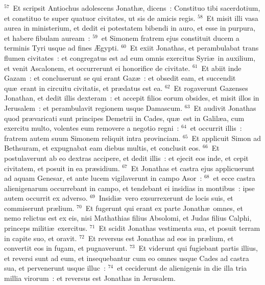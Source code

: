 ${}^{57}$~Et scripsit Antiochus adolescens Jonath\ae , dicens~: Constituo tibi sacerdotium, et constituo te super quatuor civitates, ut sis de amicis regis.
${}^{58}$~Et misit illi vasa aurea in ministerium, et dedit ei potestatem bibendi in auro, et esse in purpura, et habere fibulam auream~:
${}^{59}$~et Simonem fratrem ejus constituit ducem a terminis Tyri usque ad fines \AE gypti.
${}^{60}$~Et exiit Jonathas, et perambulabat trans flumen civitates~: et congregatus est ad eum omnis exercitus Syri\ae\ in auxilium, et venit Ascalonem, et occurrerunt ei honorifice de civitate.
${}^{61}$~Et abiit inde Gazam~: et concluserunt se qui erant Gaz\ae~: et obsedit eam, et succendit qu\ae\ erant in circuitu civitatis, et pr\ae datus est ea.
${}^{62}$~Et rogaverunt Gazenses Jonathan, et dedit illis dexteram~: et accepit filios eorum obsides, et misit illos in Jerusalem~: et perambulavit regionem usque Damascum.
${}^{63}$~Et audivit Jonathas quod pr\ae varicati sunt principes Demetrii in Cades, qu\ae\ est in Galil\ae a, cum exercitu multo, volentes eum removere a negotio regni~:
${}^{64}$~et occurrit illis~: fratrem autem suum Simonem reliquit intra provinciam.
${}^{65}$~Et applicuit Simon ad Bethsuram, et expugnabat eam diebus multis, et conclusit eos.
${}^{66}$~Et postulaverunt ab eo dextras accipere, et dedit illis~: et ejecit eos inde, et cepit civitatem, et posuit in ea pr\ae sidium.
${}^{67}$~Et Jonathas et castra ejus applicuerunt ad aquam Genesar, et ante lucem vigilaverunt in campo Asor~:
${}^{68}$~et ecce castra alienigenarum occurrebant in campo, et tendebant ei insidias in montibus~: ipse autem occurrit ex adverso.
${}^{69}$~Insidi\ae\ vero exsurrexerunt de locis suis, et commiserunt pr\ae lium.
${}^{70}$~Et fugerunt qui erant ex parte Jonath\ae\ omnes, et nemo relictus est ex eis, nisi Mathathias filius Absolomi, et Judas filius Calphi, princeps militi\ae\ exercitus.
${}^{71}$~Et scidit Jonathas vestimenta sua, et posuit terram in capite suo, et oravit.
${}^{72}$~Et reversus est Jonathas ad eos in pr\ae lium, et convertit eos in fugam, et pugnaverunt.
${}^{73}$~Et viderunt qui fugiebant partis illius, et reversi sunt ad eum, et insequebantur cum eo omnes usque Cades ad castra sua, et pervenerunt usque illuc~:
${}^{74}$~et ceciderunt de alienigenis in die illa tria millia virorum~: et reversus est Jonathas in Jerusalem.

